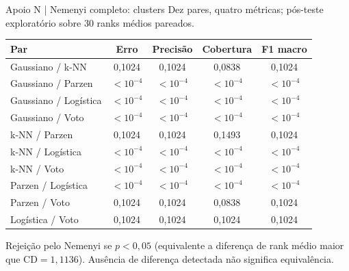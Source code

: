 \documentclass[aspectratio=169,11pt]{beamer}
\begin{document}
\begin{frame}[t]{Apoio N | Nemenyi completo: clusters}
\scriptsize Dez pares, quatro métricas; pós-teste exploratório sobre 30 ranks médios pareados.\par\vspace{2mm}
\begin{center}
\scriptsize
\renewcommand{\arraystretch}{1.13}
\setlength{\tabcolsep}{5pt}
\begin{tabular}{lcccc}
\toprule
Par & Erro & Precisão & Cobertura & F1 macro \\
\midrule
Gaussiano / k-NN & 0,1024 & 0,1024 & 0,0838 & 0,1024 \\
Gaussiano / Parzen & $<10^{-4}$ & $<10^{-4}$ & $<10^{-4}$ & $<10^{-4}$ \\
Gaussiano / Logística & $<10^{-4}$ & $<10^{-4}$ & $<10^{-4}$ & $<10^{-4}$ \\
Gaussiano / Voto & $<10^{-4}$ & $<10^{-4}$ & $<10^{-4}$ & $<10^{-4}$ \\
k-NN / Parzen & 0,1024 & 0,1024 & 0,1493 & 0,1024 \\
k-NN / Logística & $<10^{-4}$ & $<10^{-4}$ & $<10^{-4}$ & $<10^{-4}$ \\
k-NN / Voto & $<10^{-4}$ & $<10^{-4}$ & $<10^{-4}$ & $<10^{-4}$ \\
Parzen / Logística & $<10^{-4}$ & $<10^{-4}$ & $<10^{-4}$ & $<10^{-4}$ \\
Parzen / Voto & 0,1024 & 0,1024 & 0,0838 & 0,1024 \\
Logística / Voto & 0,1024 & 0,1024 & 0,1024 & 0,1024 \\
\bottomrule
\end{tabular}
\end{center}
\vspace{2mm}
\begin{notabox}\scriptsize Rejeição pelo Nemenyi se $p<0,05$ (equivalente a diferença de rank médio maior que $\mathrm{CD}=1,1136$). Ausência de diferença detectada não significa equivalência.\end{notabox}
\end{frame}
\end{document}
